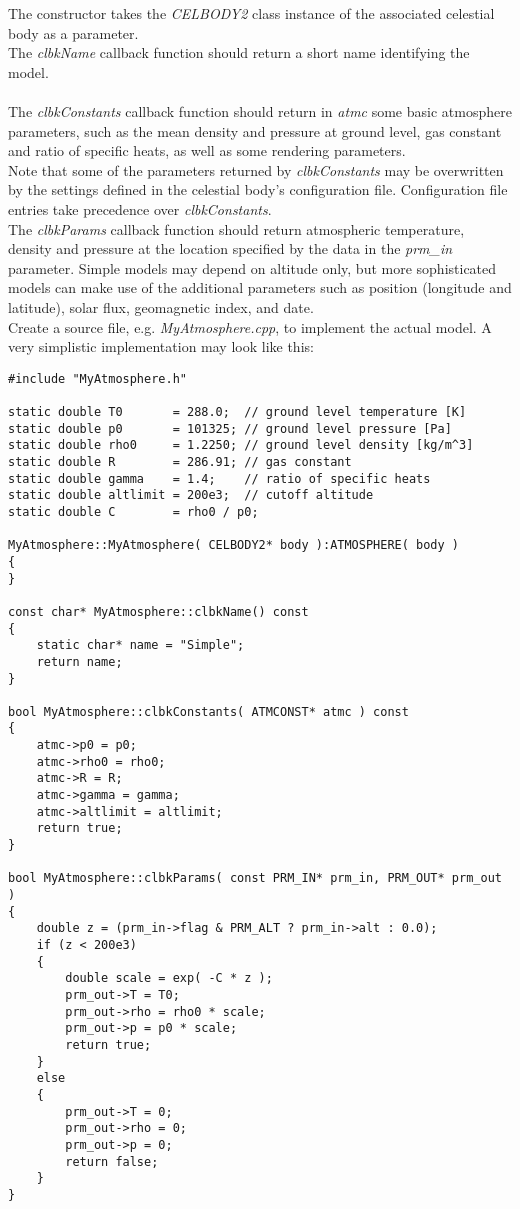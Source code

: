 \documentclass[Orbiter Developer Manual.tex]{subfiles}
\begin{document}
\noindent
The constructor takes the \textit{CELBODY2} class instance of the associated celestial body as a parameter.\\
The \textit{clbkName} callback function should return a short name identifying the model.\\
\\
The \textit{clbkConstants} callback function should return in \textit{atmc} some basic atmosphere parameters, such as the mean density and pressure at ground level, gas constant and ratio of specific heats, as well as some rendering parameters.\\
Note that some of the parameters returned by \textit{clbkConstants} may be overwritten by the settings defined in the celestial body's configuration file. Configuration file entries take precedence over \textit{clbkConstants}.\\
The \textit{clbkParams} callback function should return atmospheric temperature, density and pressure at the location specified by the data in the \textit{prm\_in} parameter. Simple models may depend on altitude only, but more sophisticated models can make use of the additional parameters such as position (longitude and latitude), solar flux, geomagnetic index, and date.\\
Create a source file, e.g. \textit{MyAtmosphere.cpp}, to implement the actual model. A very simplistic implementation may look like this:

\begin{lstlisting}
#include "MyAtmosphere.h"

static double T0       = 288.0;  // ground level temperature [K]
static double p0       = 101325; // ground level pressure [Pa]
static double rho0     = 1.2250; // ground level density [kg/m^3]
static double R        = 286.91; // gas constant
static double gamma    = 1.4;    // ratio of specific heats
static double altlimit = 200e3;  // cutoff altitude
static double C        = rho0 / p0;

MyAtmosphere::MyAtmosphere( CELBODY2* body ):ATMOSPHERE( body )
{
}

const char* MyAtmosphere::clbkName() const
{
	static char* name = "Simple";
	return name;
}

bool MyAtmosphere::clbkConstants( ATMCONST* atmc ) const
{
	atmc->p0 = p0;
	atmc->rho0 = rho0;
	atmc->R = R;
	atmc->gamma = gamma;
	atmc->altlimit = altlimit;
	return true;
}

bool MyAtmosphere::clbkParams( const PRM_IN* prm_in, PRM_OUT* prm_out )
{
	double z = (prm_in->flag & PRM_ALT ? prm_in->alt : 0.0);
	if (z < 200e3)
	{
		double scale = exp( -C * z );
		prm_out->T = T0;
		prm_out->rho = rho0 * scale;
		prm_out->p = p0 * scale;
		return true;
	}
	else
	{
		prm_out->T = 0;
		prm_out->rho = 0;
		prm_out->p = 0;
		return false;
	}
}
\end{lstlisting}
\end{document}
